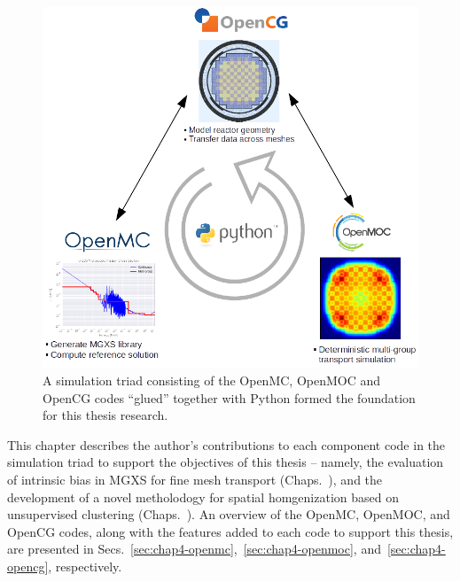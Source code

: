 \begin{figure}[h]
  \centering
  \includegraphics[width=\linewidth]{figures/workflow/triad/simulation-triad}
\caption[A simulation triad of OpenMC, OpenMOC and OpenCG]{A simulation triad consisting of the OpenMC, OpenMOC and OpenCG codes ``glued'' together with Python formed the foundation for this thesis research.}
\label{fig:chap4-simulation-triad}
\end{figure}

This chapter describes the author's contributions to each component code in the simulation triad to support the objectives of this thesis -- namely, the evaluation of intrinsic bias in \ac{MGXS} for fine mesh transport (Chaps.~), and the development of a novel metholodogy for spatial homgenization based on unsupervised clustering (Chaps.~). An overview of the OpenMC, OpenMOC, and OpenCG codes, along with the features added to each code to support this thesis, are presented in Secs.~\ref{sec:chap4-openmc},~\ref{sec:chap4-openmoc}, and~\ref{sec:chap4-opencg}, respectively.


